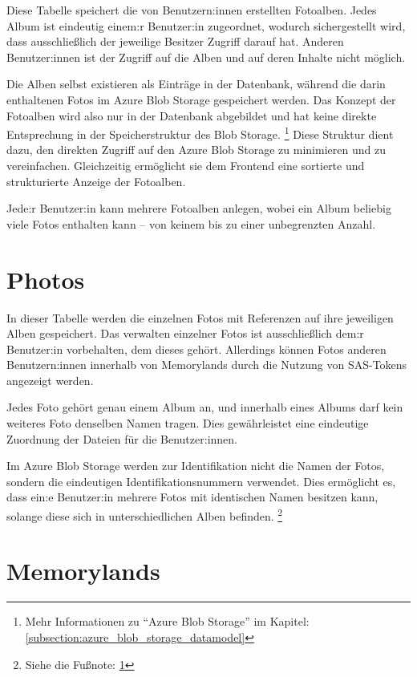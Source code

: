 Diese Tabelle speichert die von Benutzern:innen erstellten Fotoalben. Jedes Album ist eindeutig einem:r 
Benutzer:in zugeordnet, wodurch sichergestellt wird, dass ausschließlich der jeweilige Besitzer 
Zugriff darauf hat. Anderen Benutzer:innen ist der Zugriff auf die Alben und auf deren Inhalte
nicht möglich.

Die Alben selbst existieren als Einträge in der Datenbank, während die darin enthaltenen Fotos 
im Azure Blob Storage gespeichert werden. Das Konzept der Fotoalben wird also nur in der Datenbank 
abgebildet und hat keine direkte Entsprechung in der Speicherstruktur des Blob Storage. \footnote{\label{azure-blob-storage-note}Mehr Informationen zu ``Azure Blob Storage'' im Kapitel: \ref{subsection:azure_blob_storage_datamodel}}
Diese Struktur dient dazu, den direkten Zugriff auf den Azure Blob Storage zu minimieren und 
zu vereinfachen. Gleichzeitig ermöglicht sie dem Frontend eine sortierte und strukturierte 
Anzeige der Fotoalben.

Jede:r Benutzer:in kann mehrere Fotoalben anlegen, wobei ein Album beliebig viele Fotos enthalten 
kann -- von keinem bis zu einer unbegrenzten Anzahl.

\section{Photos}

In dieser Tabelle werden die einzelnen Fotos mit Referenzen auf ihre jeweiligen Alben gespeichert. 
Das verwalten einzelner Fotos ist ausschließlich dem:r Benutzer:in vorbehalten, dem dieses gehört. 
Allerdings können Fotos anderen Benutzern:innen innerhalb von Memorylands durch die Nutzung von 
SAS-Tokens angezeigt werden.

Jedes Foto gehört genau einem Album an, und innerhalb eines Albums darf kein weiteres 
Foto denselben Namen tragen. Dies gewährleistet eine eindeutige Zuordnung der Dateien für die
Benutzer:innen.

Im Azure Blob Storage werden zur Identifikation nicht die Namen der Fotos, sondern die 
eindeutigen Identifikationsnummern verwendet. Dies ermöglicht es, dass ein:e Benutzer:in mehrere
Fotos mit identischen Namen besitzen kann, solange diese sich in unterschiedlichen Alben befinden.
\footnote{Siehe die Fußnote: \ref{azure-blob-storage-note}}

\section{Memorylands}

